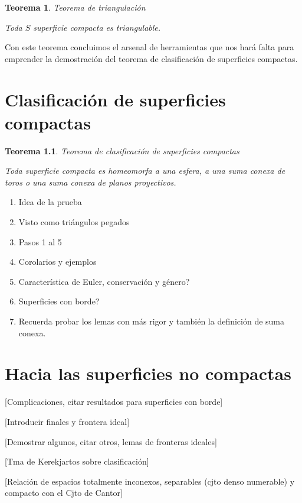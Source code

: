 \documentclass[a4paper,11pt,spanish, twoside, leqno]{tfg-uam}
\newtheorem{teor}{Teorema}[chapter]
\theoremstyle{definition}
\begin{document}
\begin{teor}{Teorema de triangulación}\label{teor:teoremaDeTriangulacion}	
	
	Toda $S$ superficie compacta es triangulable.
\end{teor}

Con este teorema concluimos el arsenal de herramientas que nos hará falta para emprender la demostración del teorema de clasificación de superficies compactas.






\chapter{Clasificación de superficies compactas}

\begin{teor}{Teorema de clasificación de superficies compactas}\label{teor:teoremadeclasificacion}
	
	Toda superficie compacta es homeomorfa a una esfera, a una suma conexa de toros o una suma conexa de planos proyectivos.
\end{teor}
\begin{enumerate}
\item Idea de la prueba
\item Visto como triángulos pegados
\item Pasos 1 al 5
\item Corolarios y ejemplos
\item Característica de Euler, conservación y género?
\item Superficies con borde?
\item Recuerda probar los lemas con más rigor y también la definición de suma conexa.
\end{enumerate}

\chapter{Hacia las superficies no compactas}
[Complicaciones, citar resultados para superficies con borde]

[Introducir finales y frontera ideal]

[Demostrar algunos, citar otros, lemas de fronteras ideales]

[Tma de Kerekjartos sobre clasificación]

[Relación de espacios totalmente inconexos, separables (cjto denso 
numerable) y compacto con el Cjto de Cantor]
\end{document}
